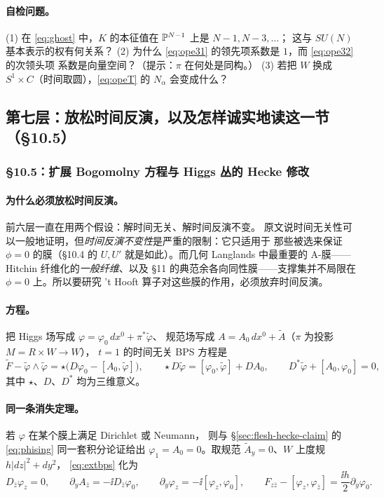 \paragraph{自检问题。}
(1) 在 \eqref{eq:ghost} 中，$K$ 的本征值在 $\mathbb{P}^{N-1}$ 上是 $N-1,N-3,\dots$；
这与 $SU(N)$ 基本表示的权有何关系？
(2) 为什么 \eqref{eq:ope31} 的领先项系数是 $1$，而 \eqref{eq:ope32} 的次领头项
系数是向量空间？（提示：$\pi$ 在何处是同构。）
(3) 若把 $W$ 换成 $S^1\times C$（时间取圆），\eqref{eq:opeT} 的 $N_\alpha$ 会变成什么？


\subsection{第七层：放松时间反演，以及怎样诚实地读这一节（§10.5）}
\label{sec:flesh-hecke-honest}

\subsubsection{§10.5：扩展 Bogomolny 方程与 Higgs 丛的 Hecke 修改}

\paragraph{为什么必须放松时间反演。}前六层一直在用两个假设：解时间无关、解时间反演不变。
原文说时间无关性可以一般地证明，但\emph{时间反演不变性}是严重的限制：它只适用于
那些被选来保证 $\phi=0$ 的膜（§10.4 的 $U,U'$ 就是如此）。而几何 Langlands 中最重要的
A-膜——Hitchin 纤维化的\emph{一般纤维}、以及 §11 的典范余各向同性膜——支撑集并不局限在
$\phi=0$ 上。所以要研究 't Hooft{} 算子对这些膜的作用，必须放弃时间反演。\pA{}

\paragraph{方程。}把 Higgs 场写成 $\varphi=\varphi_0\,dx^0+\pi^*\widetilde\varphi$、
规范场写成 $A=A_0\,dx^0+\widetilde A$（$\pi$ 为投影 $M=R\times W\to W$），
$t=1$ 的时间无关 BPS 方程是
\begin{equation}
\widetilde F-\widetilde\varphi\wedge\widetilde\varphi
=\star\bigl(D\varphi_0-[A_0,\widetilde\varphi]\bigr),\qquad
\star D\widetilde\varphi=[\varphi_0,\widetilde\varphi]+DA_0,\qquad
D^*\widetilde\varphi+[A_0,\varphi_0]=0,
\label{eq:extbps}
\end{equation}
其中 $\star$、$D$、$D^*$ 均为三维意义。\pA{}

\paragraph{同一条消失定理。}若 $\varphi$ 在某个膜上满足 Dirichlet 或 Neumann，
则与 §\ref{sec:flesh-hecke-claim} 的 \eqref{eq:phising} 同一套积分论证给出
$\varphi_1=A_0=0$。取规范 $\widetilde A_y=0$、$W$ 上度规 $h|dz|^2+dy^2$，
\eqref{eq:extbps} 化为
\begin{equation}
D_{\bar z}\varphi_z=0,\qquad
\partial_yA_{\bar z}=-\ii D_{\bar z}\varphi_0,\qquad
\partial_y\varphi_z=-\ii[\varphi_z,\varphi_0],\qquad
F_{z\bar z}-[\varphi_z,\varphi_{\bar z}]=\frac{\ii h}{2}\partial_y\varphi_0 .
\label{eq:extred}
\end{equation}
\pA{}

